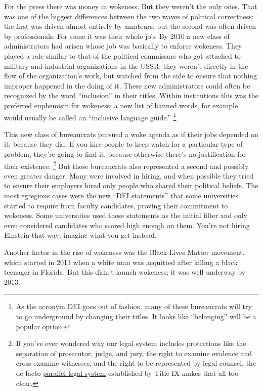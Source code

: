 For the press there was money in wokeness. But they weren't the only
ones. That was one of the biggest differences between the two waves of
political correctness: the first was driven almost entirely by amateurs,
but the second was often driven by professionals. For some it was their
whole job. By 2010 a new class of administrators had arisen whose job
was basically to enforce wokeness. They played a role similar to that of
the political commissars who got attached to military and industrial
organizations in the USSR: they weren't directly in the flow of the
organization's work, but watched from the side to ensure that nothing
improper happened in the doing of it. These new administrators could
often be recognized by the word ``inclusion'' in their titles. Within
institutions this was the preferred euphemism for wokeness; a new list
of banned words, for example, would usually be called an ``inclusive
language guide.'' \footnote{As the acronym DEI goes out of fashion, many of these
bureaucrats will try to go underground by changing their titles. It
looks like ``belonging'' will be a popular option.}

This new class of bureaucrats pursued a woke agenda as if their jobs
depended on it, because they did. If you hire people to keep watch for a
particular type of problem, they're going to find it, because otherwise
there's no justification for their existence. \footnote{If you've ever wondered why our legal system includes
protections like the separation of prosecutor, judge, and jury, the
right to examine evidence and cross-examine witnesses, and the right to
be represented by legal counsel, the de facto
\href{https://www.nytimes.com/2020/03/18/magazine/title-ix-sexual-harassment-accusations.html}{parallel
legal system} established by Title IX makes that all too clear.}
But these bureaucrats also represented a second and possibly even
greater danger. Many were involved in hiring, and when possible they
tried to ensure their employers hired only people who shared their
political beliefs. The most egregious cases were the new ``DEI
statements'' that some universities started to require from faculty
candidates, proving their commitment to wokeness. Some universities used
these statements as the initial filter and only even considered
candidates who scored high enough on them. You're not hiring Einstein
that way; imagine what you get instead.

Another factor in the rise of wokeness was the Black Lives Matter
movement, which started in 2013 when a white man was acquitted after
killing a black teenager in Florida. But this didn't launch wokeness; it
was well underway by 2013.

